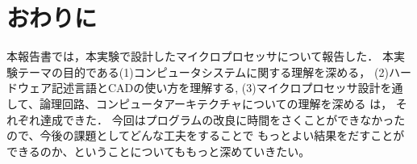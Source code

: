 \documentclass{jarticle}[11pt]
\begin{document}
\section{おわりに}
\label{sec:おわりに}
% 

\noindent

本報告書では，本実験で設計したマイクロプロセッサについて報告した．
本実験テーマの目的である(1)コンピュータシステムに関する理解を深める，
(2)ハードウェア記述言語とCADの使い方を理解する, (3)マイクロプロセッサ設計を通して、論理回路、コンピュータアーキテクチャについての理解を深める は，
それぞれ達成できた．
今回はプログラムの改良に時間をさくことができなかったので、今後の課題としてどんな工夫をすることで
もっとよい結果をだすことができるのか、ということについてももっと深めていきたい。



%
%
\end{document}
